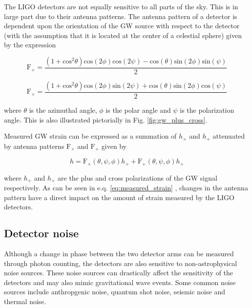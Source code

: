 The \ac{LIGO} detectors are not equally sensitive to all parts of 
the sky. This is in large part due to their antenna patterns. 
The antenna pattern of a detector is dependent upon the orientation 
of the \ac{GW} source with respect to the detector (with the assumption that it 
is located at the center of a celestial sphere) given by the expression 

\begin{equation}
    \mathrm{F}_{+} = \frac{(1+\mathrm{cos}^2 \theta) \mathrm{cos}(2\phi) \mathrm{cos}(2\psi) - \mathrm{cos}(\theta)\mathrm{sin}(2\phi)\mathrm{sin}(\psi)}{2}
\end{equation}

\begin{equation}
    \mathrm{F}_{\times} = \frac{(1+\mathrm{cos}^2 \theta) \mathrm{cos}(2\phi) \mathrm{sin}(2\psi) + \mathrm{cos}(\theta)\mathrm{sin}(2\phi)\mathrm{cos}(\psi)}{2}
\end{equation}

where $\theta$ is the azimuthal angle, $\phi$ is the polar angle and $\psi$ 
is the polarization angle. This is also illustrated pictorially in Fig. \ref{fig:gw_plus_cross}.

Measured \ac{GW} strain can be expressed as a summation of $h_{\times}$ 
and $h_{+}$ attenuated by antenna patterns $\mathrm{F}_{\times}$ and $\mathrm{F}_{+}$ 
given by

\begin{equation}
    h = \mathrm{F}_{\times}(\theta,\psi,\phi)h_{\times} + \mathrm{F}_{+}(\theta,\psi,\phi)h_{+} \label{eq:measured_strain}
\end{equation}

where $h_{+}$ and $h_{\times}$ are the plus and cross polarizations of 
the \ac{GW} signal respectively. As can be seen in e.q. \ref{eq:measured_strain}
, changes in the antenna pattern have a direct impact on the 
amount of strain measured by the \ac{LIGO} detectors.

\subsection{Detector noise}

Although a change in phase between 
the two detector arms can be measured through 
photon counting, the detectors are 
also sensitive to non-astrophysical noise 
sources. These noise sources can drastically affect 
the sensitivity of the detectors and may also mimic 
gravitational wave events. Some common noise sources 
include anthropgenic noise, quantum shot noise, 
seismic noise and thermal noise. 

